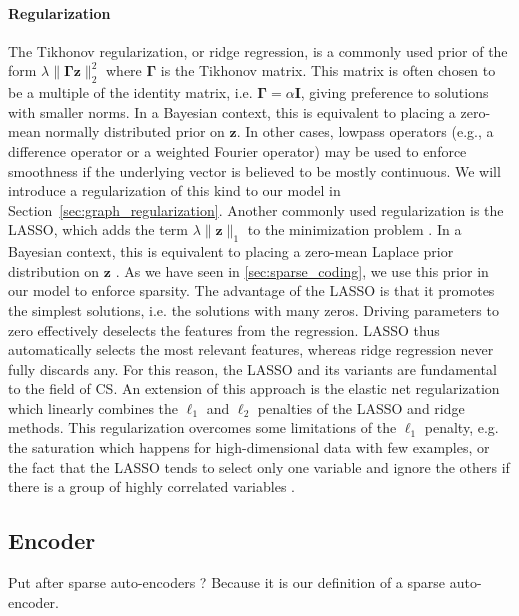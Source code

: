 \documentclass[a4paper,12pt,twoside]{report}
\newcommand{\secref}[1]{Section~\ref{#1}}
\newcommand{\normT}[1]{\| #1 \|_2^2}
\newcommand{\normO}[1]{\| #1 \|_1}
\newcommand{\z}{\mathbf{z}}
\begin{document}
\paragraph{Regularization}
The Tikhonov regularization, or ridge regression, is a commonly used prior of the form $\lambda \normT{\mathbf{\Gamma} \z}$ where $\mathbf{\Gamma}$ is the Tikhonov matrix. This matrix is often chosen to be a multiple of the identity matrix, i.e. $\mathbf{\Gamma} = \alpha \mathbf{I}$, giving preference to solutions with smaller norms. In a Bayesian context, this is equivalent to placing a zero-mean normally distributed prior on $\z$. In other cases, lowpass operators (e.g., a difference operator or a weighted Fourier operator) may be used to enforce smoothness if the underlying vector is believed to be mostly continuous. We will introduce a regularization of this kind to our model in \secref{sec:graph_regularization}.
Another commonly used regularization is the \gls{LASSO}, which adds the term $\lambda \normO{\z}$ to the minimization problem \cite{tibshirani1996Lasso}. In a Bayesian context, this is equivalent to placing a zero-mean Laplace prior distribution on $\z$ \cite{park2008BayesianLasso}. As we have seen in \ref{sec:sparse_coding}, we use this prior in our model to enforce sparsity. The advantage of the \gls{LASSO} is that it promotes the simplest solutions, i.e. the solutions with many zeros. Driving parameters to zero effectively deselects the features from the regression. \gls{LASSO} thus automatically selects the most relevant features, whereas ridge regression never fully discards any. For this reason, the \gls{LASSO} and its variants are fundamental to the field of \gls{CS}.
An extension of this approach is the elastic net regularization which linearly combines the $\ell_1$ and $\ell_2$ penalties of the \gls{LASSO} and ridge methods. This regularization overcomes some limitations of the $\ell_1$ penalty, e.g. the saturation which happens for high-dimensional data with few examples, or the fact that the \gls{LASSO} tends to select only one variable and ignore the others if there is a group of highly correlated variables \cite{zou2005ElasticNet}.

\subsection{Encoder} \label{sec:encoder}
{\color{red} Put after sparse auto-encoders ? Because it is our definition of a sparse auto-encoder.}
\end{document}
